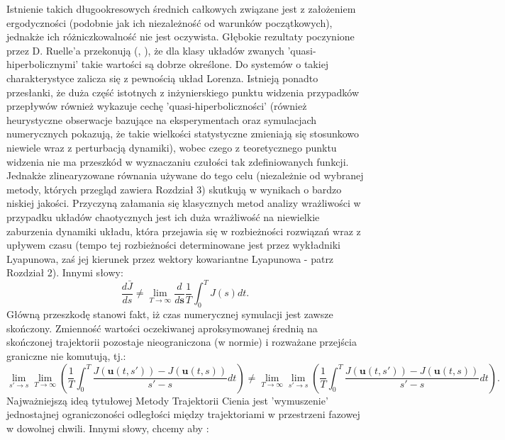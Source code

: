 \documentclass[12pt, twoside]{book}
\begin{document}
Istnienie takich długookresowych średnich całkowych związane jest z założeniem ergodyczności (podobnie jak ich niezależność od warunków początkowych), jednakże ich różniczkowalność nie jest oczywista. Głębokie rezultaty poczynione przez D. Ruelle'a przekonują (\cite{Ruelle1}, \cite{Ruelle2}), że dla klasy układów zwanych 'quasi-hiperbolicznymi' takie wartości są dobrze określone.\newline
Do systemów o takiej charakterystyce zalicza się z pewnością układ Lorenza. Istnieją ponadto przesłanki, że duża część istotnych z inżynierskiego punktu widzenia przypadków przepływów również wykazuje cechę 'quasi-hiperboliczności' \cite{Qiqi1} (również heurystyczne obserwacje bazujące na eksperymentach oraz symulacjach numerycznych pokazują, że takie wielkości statystyczne zmieniają się stosunkowo niewiele wraz z perturbacją dynamiki), wobec czego z teoretycznego punktu widzenia nie ma przeszkód w wyznaczaniu czułości tak zdefiniowanych funkcji. Jednakże zlinearyzowane równania używane do tego celu (niezależnie od wybranej metody, których przegląd zawiera Rozdział 3) skutkują w wynikach o bardzo niskiej jakości. Przyczyną załamania się klasycznych metod analizy wrażliwości w przypadku układów chaotycznych jest ich duża wrażliwość na niewielkie zaburzenia dynamiki układu, która przejawia się w rozbieżności rozwiązań wraz z upływem czasu (tempo tej rozbieżności determinowane jest przez wykładniki Lyapunowa, zaś jej kierunek przez wektory kowariantne Lyapunowa - patrz Rozdział 2). Innymi słowy: 
\begin{equation}
\frac{d\bar{J}}{ds} 
\neq \lim\limits_{\textit{T}\to\infty}\frac{d}{d\textbf{s}}\frac{1}{T}\int_{0}^{T}J(s)dt.
\label{J_derivative2}
\end{equation}
Główną przeszkodę stanowi fakt, iż czas numerycznej symulacji jest zawsze skończony. Zmienność wartości oczekiwanej aproksymowanej średnią na skończonej trajektorii pozostaje nieograniczona (w normie) i rozważane przejścia graniczne nie komutują, tj.:
\begin{equation} 
\lim\limits_{s'\to s}\lim\limits_{T\to\infty}(\frac{1}{T}\int_{0}^{T}\frac{J(\textbf{u}(t,s'))-J(\textbf{u}(t,s))}{s'-s}dt) \neq \lim\limits_{T\to\infty}\lim\limits_{s'\to s}(\frac{1}{T}\int_{0}^{T}\frac{J(\textbf{u}(t,s'))-J(\textbf{u}(t,s))}{s'-s}dt).
\label{limits_commutation}
\end{equation}
Najważniejszą ideą tytułowej Metody Trajektorii Cienia jest 'wymuszenie' jednostajnej ograniczoności odległości między trajektoriami w przestrzeni fazowej w dowolnej chwili. Innymi słowy, chcemy aby : 
\end{document}
